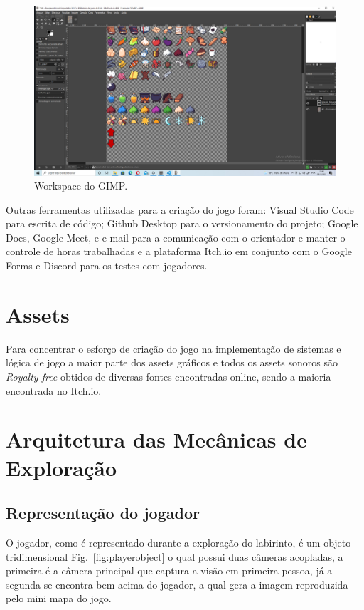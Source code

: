 \documentclass[
	12pt,				%
	openright,			%
	twoside,			%
	a4paper,			%
	english,			%
	french,				%
	spanish,			%
	brazil				%
	]{abntex2}
\begin{document}
\begin{figure}[h!]
 \centering
  \includegraphics[width=0.70\linewidth]{gimp.jpg}
  \caption{Workspace do GIMP.}
  \label{fig:gimp}
\end{figure}

Outras ferramentas utilizadas para a criação do jogo foram: Visual Studio Code para escrita de código;
Github Desktop para o versionamento do projeto; Google Docs, Google Meet, e e-mail para a
comunicação com o orientador e manter o controle de horas trabalhadas e a plataforma Itch.io em conjunto com o Google Forms e Discord para os testes com jogadores.

\section{Assets}

Para concentrar o esforço de criação do jogo na implementação de sistemas e lógica de jogo a maior parte dos assets gráficos e todos os assets sonoros são \emph{Royalty-free} obtidos de diversas fontes encontradas online, sendo a maioria encontrada no Itch.io. %


\section{Arquitetura das Mecânicas de Exploração}


\subsection{Representação do jogador}

O jogador, como é representado durante a exploração do labirinto, é um objeto tridimensional Fig.~\ref{fig:playerobject} o qual possui duas câmeras acopladas, a primeira é a câmera principal que captura a visão em primeira pessoa, já a segunda se encontra bem acima do jogador, a qual gera a imagem reproduzida pelo mini mapa do jogo.
 
\end{document}
